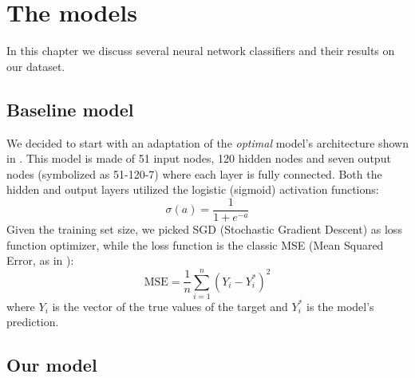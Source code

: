 \chapter{The models}
In this chapter we discuss several neural network classifiers and their results on our dataset.
\section{Baseline model}
We decided to start with an adaptation of the \textit{optimal} model's architecture shown in \cite{blackardDean}. This model is made of 51 input nodes, 120 hidden nodes and seven output nodes (symbolized as 51-120-7) where each layer is fully connected. Both the hidden and output layers utilized the logistic (sigmoid) activation functions:
$$
\sigma(a) = \frac{1}{1 + e^{-a}}
$$
Given the training set size, we picked SGD (Stochastic Gradient Descent) as loss function optimizer, while the loss function is the classic MSE (Mean Squared Error, as in \cite{blackardDean}):
\begin{equation}
\text{MSE} = \frac{1}{n}\sum_{i=1}^{n}(Y_i - Y^{*}_{i})^2
\end{equation}
where $Y_i$ is the vector of the true values of the target and $Y^{*}_{i}$ is the model's prediction.
\section{Our model}